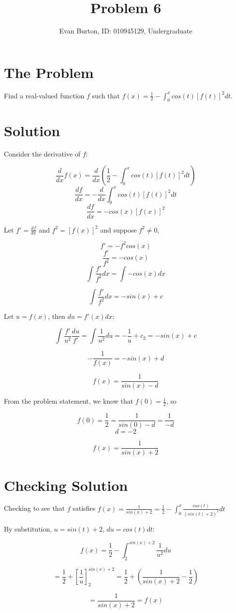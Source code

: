 \documentclass[]{article}
\title{Problem 6}
\author{Evan Burton, ID: 010945129, Undergraduate}
\begin{document}
\maketitle
\section{The Problem}
Find a real-valued function $f$ such that $f(x) = \frac{1}{2} - \displaystyle{\int_{0}^{x} cos(t)[f(t)]^2 dt}$.

\section{Solution}

Consider the derivative of $f$:

$$\frac{d}{dx}f(x) = \frac{d}{dx}(\frac{1}{2} -\int_{0}^{x} cos(t)[f(t)]^2 dt)$$
$$ \frac{df}{dx} = -\frac{d}{dx}\int_{0}^{x} cos(t)[f(t)]^2 dt$$
$$ \frac{df}{dx} = -cos(x)[f(x)]^2$$

Let $f' = \frac{df}{dx}$ and $f^2 = [f(x)]^2$ and suppose $f^2 \neq 0$,

$$f' = -f^2cos(x)$$
$$\frac{f'}{f^2} = -cos(x)$$
$$\displaystyle{\int \frac{f'}{f^2} dx} = \displaystyle{\int -cos(x) dx}$$

$$\displaystyle{\int \frac{f'}{f^2} dx} = -sin(x) + c$$

Let $u = f(x)$, then $du = f'(x) dx$:

$$\displaystyle{\int \frac{f'}{u^2} \frac{du}{f'}} = \displaystyle{\int \frac{1}{u^2}du} = - \frac{1}{u} + c_2= -sin(x) + c$$

$$-\frac{1}{f(x)} = -sin(x) + d$$

$$f(x) = \frac{1}{sin(x) - d}$$

From the problem statement, we know that $f(0) = \frac{1}{2}$, so

$$f(0) = \frac{1}{2} = \frac{1}{sin(0) - d} = \frac{1}{-d}$$
$$d = -2$$

$$f(x) = \frac{1}{sin(x) + 2}$$

\section{Checking Solution}
Checking to see that $f$ satisfies $f(x) = \frac{1}{sin(x)+2}= \frac{1}{2} - \displaystyle{\int_{0}^{x} \frac{cos(t)}{(sin(t)+2)^2} dt}$

By substitution, $u=sin(t)+2$, $du = cos(t)dt$:

$$f(x) = \frac{1}{2} - \displaystyle{\int_{2}^{sin(x)+2} \frac{1}{u^2} du}$$

$$= \frac{1}{2} + \displaystyle{\left[\frac{1}{u}\right]_{2}^{sin(x)+2}} = \frac{1}{2} + (\frac{1}{sin(x)+2} - \frac{1}{2})$$

$$
 = \frac{1}{sin(x)+2} = f(x)
$$
\end{document}
